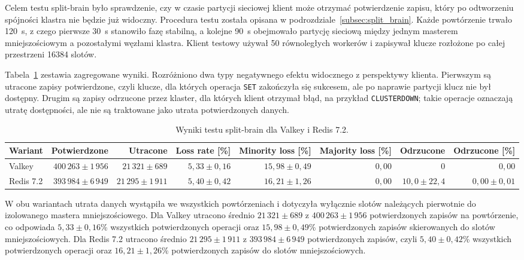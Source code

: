 Celem testu split-brain było sprawdzenie, czy w czasie partycji sieciowej klient może otrzymać potwierdzenie zapisu, który po odtworzeniu spójności klastra nie będzie już widoczny. Procedura testu została opisana w podrozdziale~\ref{subsec:split_brain}. Każde powtórzenie trwało 120~s, z czego pierwsze 30~s stanowiło fazę stabilną, a kolejne 90~s obejmowało partycję sieciową między jednym masterem mniejszościowym a pozostałymi węzłami klastra. Klient testowy używał 50 równoległych workerów i zapisywał klucze rozłożone po całej przestrzeni 16384 slotów.

Tabela~\ref{tab:split-brain-summary} zestawia zagregowane wyniki. Rozróżniono dwa typy negatywnego efektu widocznego z perspektywy klienta. Pierwszym są utracone zapisy potwierdzone, czyli klucze, dla których operacja \texttt{SET} zakończyła się sukcesem, ale po naprawie partycji klucz nie był dostępny. Drugim są zapisy odrzucone przez klaster, dla których klient otrzymał błąd, na przykład \texttt{CLUSTERDOWN}; takie operacje oznaczają utratę dostępności, ale nie są traktowane jako utrata potwierdzonych danych.

\begin{table}[htbp]
\centering
\caption{Wyniki testu split-brain dla Valkey i Redis 7.2.}
\label{tab:split-brain-summary}
\begin{adjustbox}{max width=\textwidth}
\begin{tabular}{lrrrrrrr}
\toprule
Wariant & Potwierdzone & Utracone & Loss rate [\%] & Minority loss [\%] & Majority loss [\%] & Odrzucone & Odrzucone [\%] \\
\midrule
Valkey & $400\,263 \pm 1\,956$ & $21\,321 \pm 689$ & $5{,}33 \pm 0{,}16$ & $15{,}98 \pm 0{,}49$ & $0{,}00$ & $0$ & $0{,}00$ \\
Redis 7.2 & $393\,984 \pm 6\,949$ & $21\,295 \pm 1\,911$ & $5{,}40 \pm 0{,}42$ & $16{,}21 \pm 1{,}26$ & $0{,}00$ & $10{,}0 \pm 22{,}4$ & $0{,}00 \pm 0{,}01$ \\
\bottomrule
\end{tabular}
\end{adjustbox}
\end{table}

\FloatBarrier

W obu wariantach utrata danych wystąpiła we wszystkich powtórzeniach i dotyczyła wyłącznie slotów należących pierwotnie do izolowanego mastera mniejszościowego. Dla Valkey utracono średnio $21\,321 \pm 689$ z $400\,263 \pm 1\,956$ potwierdzonych zapisów na powtórzenie, co odpowiada $5{,}33 \pm 0{,}16$\% wszystkich potwierdzonych operacji oraz $15{,}98 \pm 0{,}49$\% potwierdzonych zapisów skierowanych do slotów mniejszościowych. Dla Redis 7.2 utracono średnio $21\,295 \pm 1\,911$ z $393\,984 \pm 6\,949$ potwierdzonych zapisów, czyli $5{,}40 \pm 0{,}42$\% wszystkich potwierdzonych operacji oraz $16{,}21 \pm 1{,}26$\% potwierdzonych zapisów do slotów mniejszościowych.

